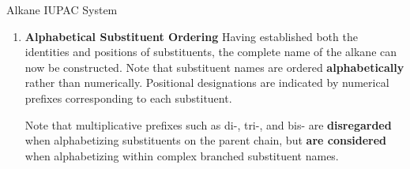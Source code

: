 \documentclass[10pt]{article}
\begin{document}
\begin{core}[label=core:alkane_iupac]{Alkane IUPAC System}
\begin{enumerate}[label=(\arabic*)]
          This numbering protocol applies equally to the parent chain within a branched substituent. However, numbering invariably begins at the carbon atom of attachment to the main chain.


          \item \textbf{Alphabetical Substituent Ordering} Having established both the identities and positions of substituents, the complete name of the alkane can now be constructed. Note that substituent names are ordered \textbf{alphabetically} rather than numerically. Positional designations are indicated by numerical prefixes corresponding to each substituent.


          Note that multiplicative prefixes such as di-, tri-, and bis- are \textbf{disregarded} when alphabetizing substituents on the parent chain, but \textbf{are considered} when alphabetizing within complex branched substituent names.


\end{enumerate}
\end{core}
\end{document}
